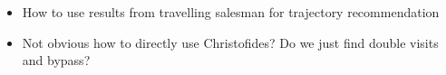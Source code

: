 
\begin{itemize}
	\item How to use results from travelling salesman for trajectory recommendation
	\item Not obvious how to directly use Christofides?
  Do we just find double visits and bypass?
\end{itemize}
